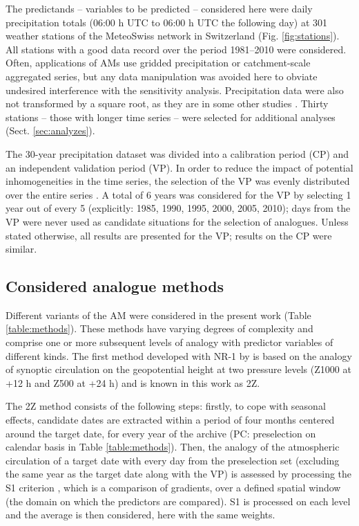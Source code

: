 \documentclass[smallextended]{svjour3}       %
\begin{document}
	The predictands -- variables to be predicted -- considered here were daily precipitation totals (06:00 h UTC to 06:00 h UTC the following day) at 301 weather stations of the MeteoSwiss network in Switzerland (Fig. \ref{fig:stations}). All stations with a good data record over the period 1981--2010 were considered. Often, applications of AMs use gridded precipitation or catchment-scale aggregated series, but any data manipulation was avoided here to obviate undesired interference with the sensitivity analysis. Precipitation data were also not transformed by a square root, as they are in some other studies \cite[see e.g.][]{Bontron2004}. Thirty stations -- those with longer time series -- were selected for additional analyses (Sect. \ref{sec:analyzes}).
	
	The 30-year precipitation dataset was divided into a calibration period (CP) and an independent validation period (VP). In order to reduce the impact of potential inhomogeneities in the time series, the selection of the VP was evenly distributed over the entire series \citep[as in][]{BenDaoud2010}. A total of 6 years was considered for the VP by selecting 1 year out of every 5 (explicitly: 1985, 1990, 1995, 2000, 2005, 2010); days from the VP were never used as candidate situations for the selection of analogues. Unless stated otherwise, all results are presented for the VP; results on the CP were similar.
	
	
	\subsection{Considered analogue methods}
	\label{sec:ams}
	
	Different variants of the AM were considered in the present work (Table \ref{table:methods}). These methods have varying degrees of complexity and comprise one or more subsequent levels of analogy with predictor variables of different kinds. The first method developed with NR-1 by \citet{Bontron2004} is based on the analogy of synoptic circulation on the geopotential height at two pressure levels (Z1000 at +12 h and Z500 at +24 h) and is known in this work as 2Z.
	
	The 2Z method consists of the following steps: firstly, to cope with seasonal effects, candidate dates are extracted within a period of four months centered around the target date, for every year of the archive (PC: preselection on calendar basis in Table \ref{table:methods}). Then, the analogy of the atmospheric circulation of a target date with every day from the preselection set (excluding the same year as the target date along with the VP) is assessed by processing the S1 criterion \citep[Eq.\ \ref{eq:S1}, ][]{Teweles1954, Drosdowsky2003}, which is a comparison of gradients, over a defined spatial window (the domain on which the predictors are compared). S1 is processed on each level and the average is then considered, here with the same weights.
	
\end{document}
